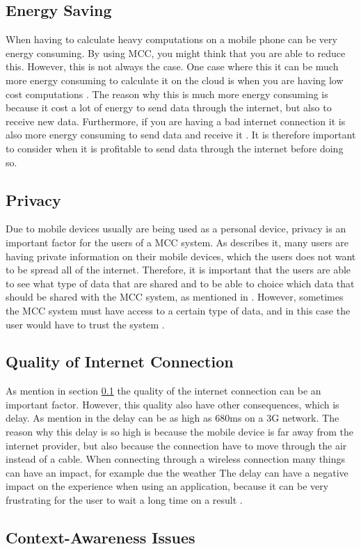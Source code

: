 
\subsection{Energy Saving}\label{EnergySaving}
When having to calculate heavy computations on a mobile phone can be very energy consuming.
By using MCC, you might think that you are able to reduce this.
However, this is not always the case.
One case where this it can be much more energy consuming to calculate it on the cloud is when you are having low cost computations \citep{goyalmobile,liu2013gearing,fernando2013mobile}.
The reason why this is much more energy consuming is because it cost a lot of energy to send data through the internet, but also to receive new data.
Furthermore, if you are having a bad internet connection it is also more energy consuming to send data and receive it \citep{goyalmobile,liu2013gearing,fernando2013mobile}.
It is therefore important to consider when it is profitable to send data through the internet before doing so.

\subsection{Privacy}
Due to mobile devices usually are being used as a personal device, privacy is an important factor for the users of a MCC system.
As \citet{liu2013gearing, fernando2013mobile} describes it, many users are having private information on their mobile devices, which the users does not want to be spread all of the internet.
Therefore, it is important that the users are able to see what type of data that are shared and to be able to choice which data that should be shared with the MCC system, as mentioned in \citet{sanaei2014heterogeneity}.
However, sometimes the MCC system must have access to a certain type of data, and in this case the user would have to trust the system \citep{fernando2013mobile}.

\subsection{Quality of Internet Connection}
As mention in section \ref{EnergySaving} the quality of the internet connection can be an important factor.
However, this quality also have other consequences, which is delay.
As mention in \citep{fernando2013mobile} the delay can be as high as 680ms on a 3G network.
The reason why this delay is so high is because the mobile device is far away from the internet provider, but also because the connection have to move through the air instead of a cable.
When connecting through a wireless connection many things can have an impact, for example due the weather \citep{dev2014review,kumar2013mobile}
The delay can have a negative impact on the experience when using an application, because it can be very frustrating for the user to wait a long time on a result \citep{hazarika2014mobile}.

\subsection{Context-Awareness Issues}
\citep{sanaei2014heterogeneity}
\citep{fernando2013mobile}